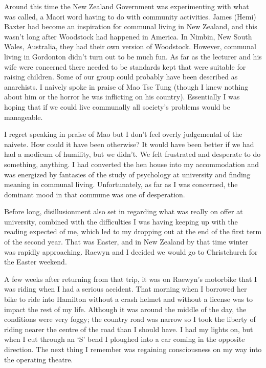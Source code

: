 Around this time the New Zealand Government was experimenting with what
was called\cite{ohu}, a Maori word having to do with community activities. James
(Hemi) Baxter had become an inspiration for communal living in New
Zealand, and this wasn't long after Woodstock had happened in America.
In Nimbin, New South Wales, Australia, they had their own version of
Woodstock. However, communal living in Gordonton didn't turn out to be
much fun. As far as the lecturer and his wife were concerned there
needed to be standards kept that were suitable for raising children.
Some of our group could probably have been described as anarchists. I
naively spoke in praise of Mao Tse Tung (though I knew nothing about him
or the horror he was inflicting on his country). Essentially I was
hoping that if we could live communally all society's problems would be
manageable.

I regret speaking in praise of Mao but I don't feel overly judgemental
of the naivete. How could it have been otherwise? It would have been
better if we had had a modicum of humility, but we didn't. We felt
frustrated and desperate to do something, anything. I had converted the
hen house into my accommodation and was energized by fantasies of the
study of psychology at university and finding meaning in communal
living. Unfortunately, as far as I was concerned, the dominant mood in
that commune was one of desperation.

Before long, disillusionment also set in regarding what was really on
offer at university, combined with the difficulties I was having keeping
up with the reading expected of me, which led to my dropping out at the
end of the first term of the second year. That was Easter, and in New
Zealand by that time winter was rapidly approaching. Raewyn and I
decided we would go to Christchurch for the Easter weekend.

\enlargethispage{\baselineskip}

A few weeks after returning from that trip, it was on Raewyn's motorbike
that I was riding when I had a serious accident. That morning when I
borrowed her bike to ride into Hamilton without a crash helmet and
without a license was to impact the rest of my life. Although it was
around the middle of the day, the conditions were very foggy; the
country road was narrow so I took the liberty of riding nearer the
centre of the road than I should have. I had my lights on, but when I
cut through an `S' bend I ploughed into a car coming in the opposite
direction. The next thing I remember was regaining consciousness on my
way into the operating theatre.

